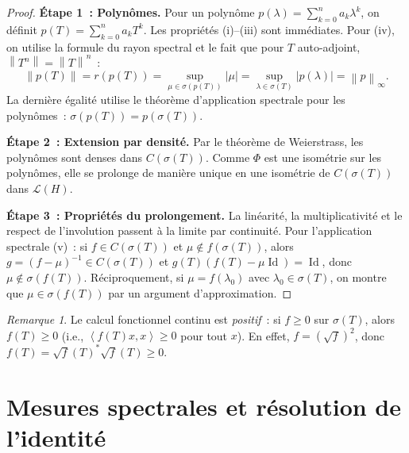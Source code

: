 \documentclass[a4paper,12pt]{book}
\DeclareMathOperator{\Id}{Id}
\newcommand{\norm}[1]{\left\| #1 \right\|}
\newcommand{\abs}[1]{\left| #1 \right|}
\newcommand{\inner}[2]{\left\langle #1, #2 \right\rangle}
\theoremstyle{definition}
\theoremstyle{plain}
\theoremstyle{remark}
\newtheorem{remarque}[definition]{Remarque}
\begin{document}
\begin{proof}
\textbf{Étape 1~: Polynômes.} Pour un polynôme $p(\lambda) = \sum_{k=0}^n a_k \lambda^k$,
on définit $p(T) = \sum_{k=0}^n a_k T^k$. Les propriétés (i)--(iii) sont immédiates. Pour
(iv), on utilise la formule du rayon spectral et le fait que pour $T$
auto-adjoint, $\norm{T^n} = \norm{T}^n$~:
\[
  \norm{p(T)} = r(p(T)) = \sup_{\mu \in \sigma(p(T))} \abs{\mu}
    = \sup_{\lambda \in \sigma(T)} \abs{p(\lambda)} = \norm{p}_\infty.
\]
La dernière égalité utilise le théorème d'application spectrale pour les polynômes~:
$\sigma(p(T)) = p(\sigma(T))$.

\textbf{Étape 2~: Extension par densité.} Par le théorème de
Weierstrass, les polynômes sont denses dans
$C(\sigma(T))$. Comme $\Phi$ est une isométrie sur les polynômes, elle se prolonge de
manière unique en une isométrie de $C(\sigma(T))$ dans $\mathcal{L}(H)$.

\textbf{Étape 3~: Propriétés du prolongement.} La linéarité, la multiplicativité et le
respect de l'involution passent à la limite par continuité. Pour l'application spectrale
(v)~: si $f \in C(\sigma(T))$ et $\mu \notin f(\sigma(T))$, alors
$g = (f - \mu)^{-1} \in C(\sigma(T))$ et $g(T)(f(T) - \mu\Id) = \Id$, donc
$\mu \notin \sigma(f(T))$. Réciproquement, si $\mu = f(\lambda_0)$ avec
$\lambda_0 \in \sigma(T)$, on montre que $\mu \in \sigma(f(T))$ par un argument
d'approximation.
\end{proof}

\begin{remarque}
Le calcul fonctionnel continu est \emph{positif}~: si $f \ge 0$ sur $\sigma(T)$, alors
$f(T) \ge 0$ (i.e., $\inner{f(T)x}{x} \ge 0$ pour tout $x$). En effet,
$f = (\sqrt{f})^2$, donc $f(T) = \sqrt{f}(T)^* \sqrt{f}(T) \ge 0$.
\end{remarque}

\section{Mesures spectrales et résolution de l'identité}
\end{document}
